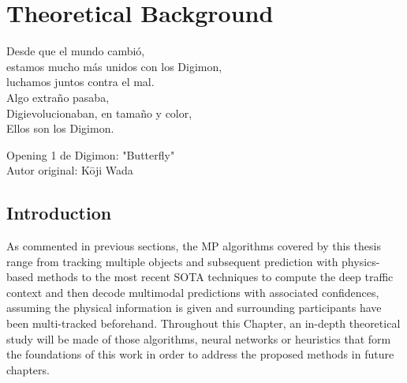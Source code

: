 % 
% 
% 
% 
% 
% 
% 

\chapter{Theoretical Background}
\label{cha:theoretical_background}

\begin{FraseCelebre}
	\begin{Frase}
		Desde que el mundo cambió, \\
		estamos mucho más unidos con los Digimon, \\
		luchamos juntos contra el mal. \\ 

		Algo extraño pasaba, \\
		Digievolucionaban, en tamaño y color, \\
		Ellos son los Digimon. 
	\end{Frase}
	\begin{Fuente}
		Opening 1 de Digimon: "Butterfly" \\
		Autor original: Kōji Wada
	\end{Fuente}
\end{FraseCelebre}

\section{Introduction}
\label{sec:3_introduction}

As commented in previous sections, the \ac{MP} algorithms covered by this thesis range from tracking multiple objects and subsequent prediction with physics-based methods to the most recent \ac{SOTA} techniques to compute the deep traffic context and then decode multimodal predictions with associated confidences, assuming the physical information is given and surrounding participants have been multi-tracked beforehand. Throughout this Chapter, an in-depth theoretical study will be made of those algorithms, neural networks or heuristics that form the foundations of this work in order to address the proposed methods in future chapters.

